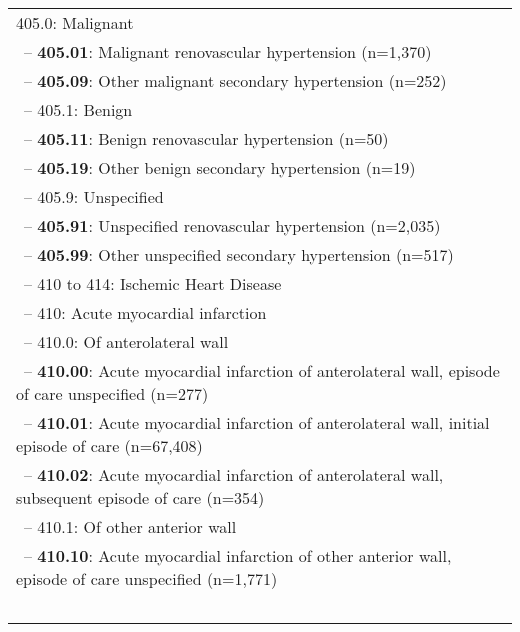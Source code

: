\begin{longtable}{p{\textwidth}}
405.0: Malignant} \\ \-\ \hspace{40pt}\footnotesize{-- {\color{ForestGreen} \textbf{405.01}}: Malignant renovascular hypertension (n=1,370)} \\ \-\ \hspace{40pt}\footnotesize{-- {\color{ForestGreen} \textbf{405.09}}: Other malignant secondary hypertension (n=252)} \\ \-\ \hspace{30pt}\footnotesize{-- 405.1: Benign} \\ \-\ \hspace{40pt}\footnotesize{-- {\color{ForestGreen} \textbf{405.11}}: Benign renovascular hypertension (n=50)} \\ \-\ \hspace{40pt}\footnotesize{-- {\color{ForestGreen} \textbf{405.19}}: Other benign secondary hypertension (n=19)} \\ \-\ \hspace{30pt}\footnotesize{-- 405.9: Unspecified} \\ \-\ \hspace{40pt}\footnotesize{-- {\color{ForestGreen} \textbf{405.91}}: Unspecified renovascular hypertension (n=2,035)} \\ \-\ \hspace{40pt}\footnotesize{-- {\color{ForestGreen} \textbf{405.99}}: Other unspecified secondary hypertension (n=517)} \\ \-\ \hspace{10pt}\footnotesize{-- 410 to 414: Ischemic Heart Disease} \\ \-\ \hspace{20pt}\footnotesize{-- 410: Acute myocardial infarction} \\ \-\ \hspace{30pt}\footnotesize{-- 410.0: Of anterolateral wall} \\ \-\ \hspace{40pt}\footnotesize{-- {\color{ForestGreen} \textbf{410.00}}: Acute myocardial infarction of anterolateral wall, episode of care unspecified (n=277)} \\ \-\ \hspace{40pt}\footnotesize{-- {\color{ForestGreen} \textbf{410.01}}: Acute myocardial infarction of anterolateral wall, initial episode of care (n=67,408)} \\ \-\ \hspace{40pt}\footnotesize{-- {\color{ForestGreen} \textbf{410.02}}: Acute myocardial infarction of anterolateral wall, subsequent episode of care (n=354)} \\ \-\ \hspace{30pt}\footnotesize{-- 410.1: Of other anterior wall} \\ \-\ \hspace{40pt}\footnotesize{-- {\color{ForestGreen} \textbf{410.10}}: Acute myocardial infarction of other anterior wall, episode of care unspecified (n=1,771)} \\ \-\ \hspace{40pt}\footnotesize{-- {\color{ForestGreen} \textbf{410.11}}: Acute myocardial 
\end{longtable}
